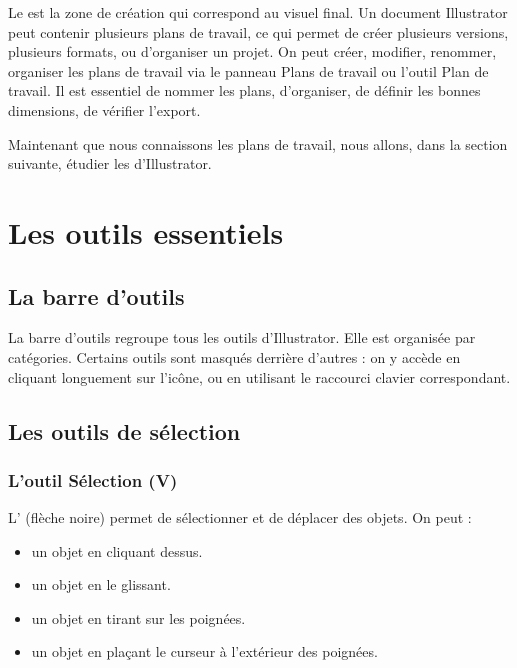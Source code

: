 Le  est la zone de création qui correspond au visuel final. Un document Illustrator peut contenir plusieurs plans de travail, ce qui permet de créer plusieurs versions, plusieurs formats, ou d'organiser un projet. On peut créer, modifier, renommer, organiser les plans de travail via le panneau Plans de travail ou l'outil Plan de travail. Il est essentiel de nommer les plans, d'organiser, de définir les bonnes dimensions, de vérifier l'export.

Maintenant que nous connaissons les plans de travail, nous allons, dans la section suivante, étudier les  d'Illustrator.

\section{Les outils essentiels}

\subsection{La barre d'outils}

La barre d'outils regroupe tous les outils d'Illustrator. Elle est organisée par catégories. Certains outils sont masqués derrière d'autres : on y accède en cliquant longuement sur l'icône, ou en utilisant le raccourci clavier correspondant.

\subsection{Les outils de sélection}

\subsubsection{L'outil Sélection (V)}

L' (flèche noire) permet de sélectionner et de déplacer des objets. On peut :

\begin{itemize}
    \item {} un objet en cliquant dessus.
    \item {} un objet en le glissant.
    \item {} un objet en tirant sur les poignées.
    \item {} un objet en plaçant le curseur à l'extérieur des poignées.
\end{itemize}

